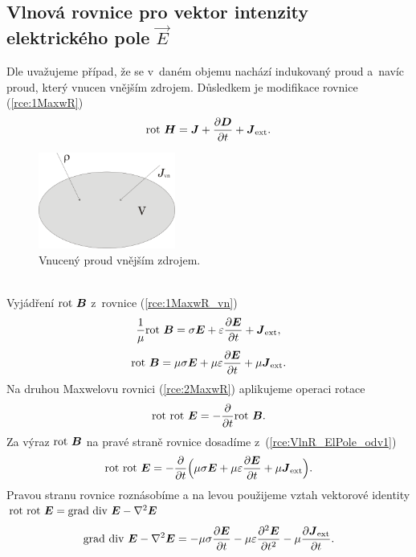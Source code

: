 \subsection{Vlnová rovnice pro vektor intenzity elektrického pole $\vec E$}
Dle \cite[str. 33]{emp} uvažujeme případ, že se v~daném objemu nachází indukovaný proud a~navíc proud, který vnucen vnějším zdrojem. Důsledkem je modifikace rovnice (\ref{rce:1MaxwR})
\begin{equation}
	\mathrm{rot}\ \mbox{\boldmath$H$} = \mbox{\boldmath$J$}+\frac{\partial\mbox{\boldmath$D$}}{\partial t}+\mbox{\boldmath$J$}_{\mathrm{ext}}.
	\label{rce:1MaxwR_vn}
\end{equation}
\begin{figure}[!h]
	\centering
	\includegraphics[width=4.5cm]{vnuceny_I.png}
	\caption{Vnucený proud vnějším zdrojem.}
	\label{obr:vnuceny_I}
\end{figure}\\
Vyjádření $\mathrm{rot}\ \mbox{\boldmath$B$}$ z~rovnice (\ref{rce:1MaxwR_vn})
\begin{displaymath}
	\frac{1}{\mu} \mathrm{rot}\ \mbox{\boldmath$B$} = \sigma \mbox{\boldmath$E$}+\varepsilon\frac{\partial\mbox{\boldmath$E$}}{\partial t}+\mbox{\boldmath$J$}_{\mathrm{ext}},
\end{displaymath}
\begin{equation}
	\mathrm{rot}\ \mbox{\boldmath$B$} = \mu\sigma\mbox{\boldmath$E$}+\mu\varepsilon\frac{\partial\mbox{\boldmath$E$}}{\partial t}+\mu\mbox{\boldmath$J$}_{\mathrm{ext}}.
	\label{rce:VlnR_ElPole_odv1}
\end{equation}
Na druhou Maxwelovu rovnici (\ref{rce:2MaxwR}) aplikujeme operaci rotace
\begin{displaymath}
	\mathrm{rot}\ \mathrm{rot}\ \mbox{\boldmath$E$} = -\frac{\partial}{\partial t}\mathrm{rot}\ \mbox{\boldmath$B$}.
\end{displaymath}
Za výraz $\mathrm{rot}\ \mbox{\boldmath$B$}$ na pravé straně rovnice dosadíme z~(\ref{rce:VlnR_ElPole_odv1})
\begin{displaymath}
	\mathrm{rot}\ \mathrm{rot}\ \mbox{\boldmath$E$} = -\frac{\partial}{\partial t}\Big(\mu\sigma\mbox{\boldmath$E$}+\mu\varepsilon\frac{\partial\mbox{\boldmath$E$}}{\partial t}+\mu\mbox{\boldmath$J$}_{\mathrm{ext}}\Big).
\end{displaymath}
Pravou stranu rovnice roznásobíme a na levou použijeme vztah vektorové identity $\mathrm{rot}\ \mathrm{rot}\ \mbox{\boldmath$E$} = \mathrm{grad}\ \mathrm{div}\ \mbox{\boldmath$E$} - \nabla^{2}\mbox{\boldmath$E$}$ 
\begin{displaymath}
	\mathrm{grad}\ \mathrm{div}\ \mbox{\boldmath$E$} - \nabla^{2}\mbox{\boldmath$E$} = -\mu\sigma\frac{\partial\mbox{\boldmath$E$}}{\partial t}-\mu\varepsilon\frac{\partial^{2}\mbox{\boldmath$E$}}{\partial t^{2}}-\mu\frac{\partial\mbox{\boldmath$J$}_{\mathrm{ext}}}{\partial t}.
\end{displaymath}

